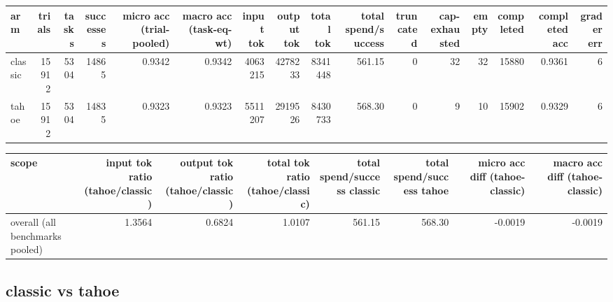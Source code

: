 \documentclass[11pt,a4paper]{article}
\begin{document}
\begin{tabular}{@{}l r r r r r r r r r r r r r r r@{}}
\toprule
arm & trials & tasks & successes & micro acc (trial-pooled) & macro acc (task-eq-wt) & input tok & output tok & total tok & total spend/success & truncated & cap-exhausted & empty & completed & completed acc & grader err \\
\midrule
classic & 15912 & 5304 & 14865 & 0.9342 & 0.9342 & 4063215 & 4278233 & 8341448 & 561.15 & 0 & 32 & 32 & 15880 & 0.9361 & 6 \\
tahoe & 15912 & 5304 & 14835 & 0.9323 & 0.9323 & 5511207 & 2919526 & 8430733 & 568.30 & 0 & 9 & 10 & 15902 & 0.9329 & 6 \\
\bottomrule
\end{tabular}

\begin{tabular}{@{}l r r r r r r r@{}}
\toprule
scope & input tok ratio (tahoe/classic) & output tok ratio (tahoe/classic) & total tok ratio (tahoe/classic) & total spend/success classic & total spend/success tahoe & micro acc diff (tahoe-classic) & macro acc diff (tahoe-classic) \\
\midrule
overall (all benchmarks pooled) & 1.3564 & 0.6824 & 1.0107 & 561.15 & 568.30 & -0.0019 & -0.0019 \\
\bottomrule
\end{tabular}

\subsection*{classic vs tahoe}
\end{document}

